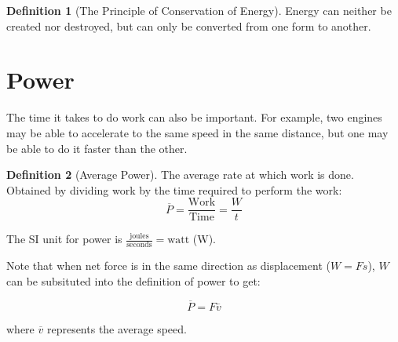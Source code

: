 \documentclass[12pt, a4paper]{article}
\theoremstyle{definition}
\newtheorem{definition}{Definition}
\begin{document}
\begin{definition}[The Principle of Conservation of Energy]
    Energy can neither be created nor destroyed, but can only be converted from one form to another.
\end{definition}

\newpage

\section{Power}
The time it takes to do work can also be important. For example, two engines may be able to accelerate to the same speed in the same distance, but one may be able to do it faster than the other.

\begin{definition}[Average Power]
    The average rate at which work is done. Obtained by dividing work by the time required to perform the work:
    \[\overline{P} = \mathrm{\frac{Work}{Time}} = \frac{W}{t}\]

    The SI unit for power is $\mathrm{\frac{joules}{seconds}} = \mathrm{watt}$ (W).
\end{definition}

Note that when net force is in the same direction as displacement ($W = Fs$), $W$ can be subsituted into the definition of power to get:

\[\overline{P} = F\overline{v}\]

where $\overline{v}$ represents the average speed.
\end{document}
